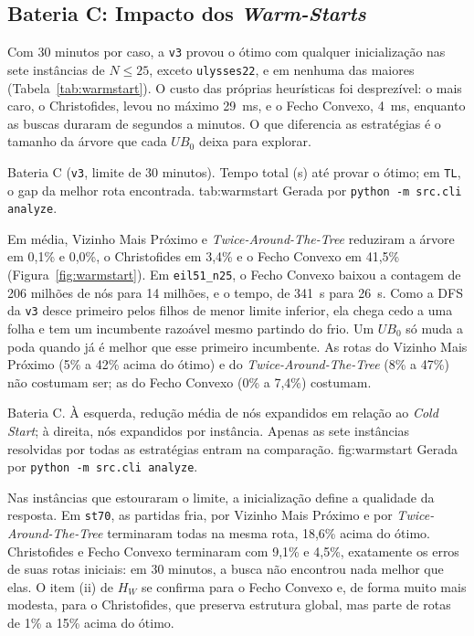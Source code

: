 \subsection{Bateria C: Impacto dos \textit{Warm-Starts}}
\label{sec:res_warmstart}

Com 30 minutos por caso, a \texttt{v3} provou o ótimo com qualquer inicialização nas sete
instâncias de $N \le 25$, exceto \texttt{ulysses22}, e em nenhuma das maiores
(Tabela~\ref{tab:warmstart}). O custo das próprias heurísticas foi desprezível: o mais caro, o
Christofides, levou no máximo 29~ms, e o Fecho Convexo, 4~ms, enquanto as buscas duraram de
segundos a minutos. O que diferencia as estratégias é o tamanho da árvore que cada $UB_0$ deixa
para explorar.

{Bateria C (\texttt{v3}, limite de 30 minutos). Tempo total (s) até provar o ótimo; em
\texttt{TL}, o gap da melhor rota encontrada.}
{tab:warmstart}
{Gerada por \texttt{python -m src.cli analyze}.}

Em média, Vizinho Mais Próximo e \textit{Twice-Around-The-Tree} reduziram a árvore em 0,1\% e
0,0\%, o Christofides em 3,4\% e o Fecho Convexo em 41,5\% (Figura~\ref{fig:warmstart}). Em
\texttt{eil51\_n25}, o Fecho Convexo baixou a contagem de 206 milhões de nós para 14 milhões, e
o tempo, de 341~s para 26~s. Como a DFS da \texttt{v3} desce primeiro pelos filhos de menor
limite inferior, ela chega cedo a uma folha e tem um incumbente razoável mesmo partindo do frio.
Um $UB_0$ só muda a poda quando já é melhor que esse primeiro incumbente. As rotas do Vizinho
Mais Próximo (5\% a 42\% acima do ótimo) e do \textit{Twice-Around-The-Tree} (8\% a 47\%) não
costumam ser; as do Fecho Convexo (0\% a 7,4\%) costumam.

{Bateria C. À esquerda, redução média de nós expandidos em relação ao \textit{Cold Start}; à
direita, nós expandidos por instância. Apenas as sete instâncias resolvidas por todas as
estratégias entram na comparação.}
{fig:warmstart}
{Gerada por \texttt{python -m src.cli analyze}.}

Nas instâncias que estouraram o limite, a inicialização define a qualidade da resposta. Em
\texttt{st70}, as partidas fria, por Vizinho Mais Próximo e por \textit{Twice-Around-The-Tree}
terminaram todas na mesma rota, 18,6\% acima do ótimo. Christofides e Fecho Convexo terminaram
com 9,1\% e 4,5\%, exatamente os erros de suas rotas iniciais: em 30 minutos, a busca não
encontrou nada melhor que elas. O item (ii) de $H_W$ se confirma para o Fecho Convexo e,
de forma muito mais modesta, para o Christofides, que preserva estrutura global, mas parte de
rotas de 1\% a 15\% acima do ótimo.


